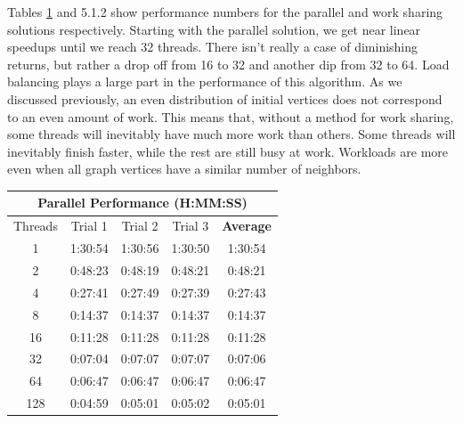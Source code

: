 \documentclass[12pt,twoside]{reedthesis}
\begin{document}
Tables \ref{table:p_perf} and 5.1.2 show performance numbers for the parallel and work sharing solutions respectively. Starting with the parallel solution, we get near linear speedups until we reach 32 threads. There isn't really a case of diminishing returns, but rather a drop off from 16 to 32 and another dip from 32 to 64. Load balancing plays a large part in the performance of this algorithm. As we discussed previously, an even distribution of initial vertices does not correspond to an even amount of work. This means that, without a method for work sharing, some threads will inevitably have much more work than others. Some threads will inevitably finish faster, while the rest are still busy at work. Workloads are more even when all graph vertices have a similar number of neighbors.
\begin{table}[h!]
\begin{tabular}{ |c | c | c | c | c | }
	 \hline
 	\multicolumn{5}{|c|}{Parallel Performance  (H:MM:SS)}\\
 	\hline
	 Threads & Trial 1 & Trial 2 & Trial 3 & \textbf{Average} \\
 	\hline
	1 & 1:30:54 & 1:30:56 & 1:30:50 & 1:30:54  \\
	2 & 0:48:23 & 0:48:19 & 0:48:21 & 0:48:21  \\
	4 & 0:27:41 & 0:27:49 & 0:27:39 & 0:27:43  \\
	8 & 0:14:37 & 0:14:37 & 0:14:37 & 0:14:37  \\
	16 & 0:11:28 & 0:11:28 & 0:11:28 & 0:11:28  \\
	32 & 0:07:04 & 0:07:07 & 0:07:07 & 0:07:06  \\
	64 & 0:06:47 & 0:06:47 & 0:06:47 & 0:06:47  \\
	128 & 0:04:59 & 0:05:01 & 0:05:02 & 0:05:01 \\
	 \hline
\end{tabular}
\label{table:p_perf}
\end{table}
	
\end{document}

